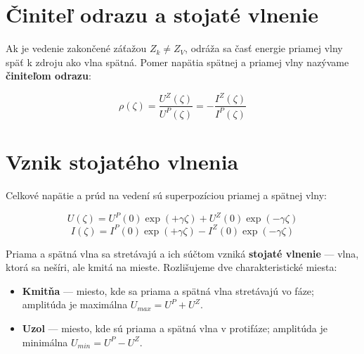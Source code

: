 \section{Činiteľ odrazu a stojaté vlnenie}

Ak je vedenie zakončené záťažou $Z_k \neq Z_V$, odráža sa časť energie 
priamej vlny späť k zdroju ako vlna spätná. Pomer napätia spätnej 
a priamej vlny nazývame \textbf{činiteľom odrazu}:

\begin{equation}
	\rho(\zeta) = \frac{U^Z(\zeta)}{U^P(\zeta)} = -\frac{I^Z(\zeta)}{I^P(\zeta)}
\end{equation}

%
%

\section{Vznik stojatého vlnenia}

Celkové napätie a prúd na vedení sú superpozíciou priamej a spätnej vlny:

\begin{equation}
	U(\zeta) = U^P(0)\exp(+\gamma\zeta) + U^Z(0)\exp(-\gamma\zeta)
\end{equation}
\begin{equation}
	I(\zeta) = I^P(0)\exp(+\gamma\zeta) - I^Z(0)\exp(-\gamma\zeta)
\end{equation}

\newpage
Priama a spätná vlna sa stretávajú a ich súčtom vzniká \textbf{stojaté 
	vlnenie} — vlna, ktorá sa nešíri, ale kmitá na mieste. Rozlišujeme 
dve charakteristické miesta:

\begin{itemize}
	\item \textbf{Kmitňa} — miesto, kde sa priama a spätná vlna 
	stretávajú vo fáze; amplitúda je maximálna 
	$U_{max} = U^P + U^Z$.
	\item \textbf{Uzol} — miesto, kde sú priama a spätná vlna 
	v protifáze; amplitúda je minimálna 
	$U_{min} = U^P - U^Z$.
\end{itemize}

